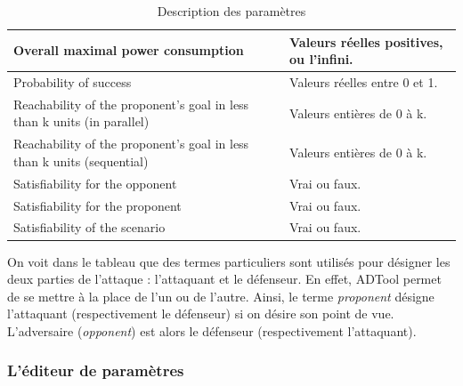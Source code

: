 \begin{table}[!h]
\begin{tabular}{|p{6cm}|p{5cm}|}
  Overall maximal power consumption & 
  Valeurs réelles positives, ou l'infini.\\ \hline
  Probability of success &
  Valeurs réelles entre 0 et 1.\\ \hline
  Reachability of the proponent's goal in less than k units (in parallel)
  & Valeurs entières de 0 à k. \\ \hline
  Reachability of the proponent's goal in less than k units (sequential)
  & Valeurs entières de 0 à k. \\ \hline
  Satisfiability for the opponent
  & Vrai ou faux. \\ \hline
  Satisfiability for the proponent
  & Vrai ou faux. \\ \hline
  Satisfiability of the scenario
  & Vrai ou faux. \\
  \hline
\end{tabular}
	\caption{Description des paramètres}
	\label{tab:DescriptionParam}
\end{table}

On voit dans le tableau que des termes particuliers sont utilisés pour désigner les deux parties de l'attaque : l'attaquant et le défenseur. En effet, ADTool permet de se mettre à la place de l'un ou de l'autre. Ainsi, le terme \textit{proponent} désigne l'attaquant (respectivement le défenseur) si on désire son point de vue. L'adversaire (\textit{opponent}) est alors le défenseur (respectivement l'attaquant).

\subsubsection{L'éditeur de paramètres}

		
		

